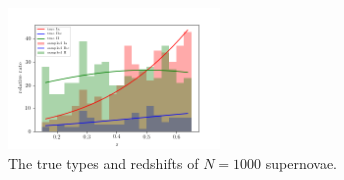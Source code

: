 \documentclass[12pt, onecolumn]{emulateapj}
\begin{document}
\begin{figure}
	\begin{center}
		\includegraphics[width=0.5\textwidth]{fig/obs_rates.png}
		\caption{The true types and redshifts of $N=1000$ supernovae.}
		\label{fig:obs_rates}
	\end{center}
\end{figure}
\end{document}
